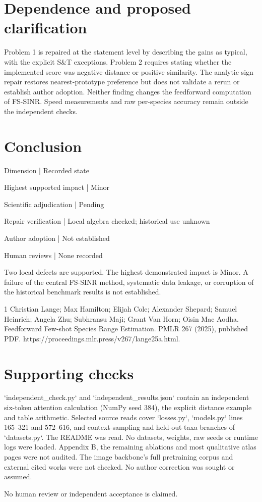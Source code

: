 \documentclass[10pt]{article}
\begin{document}
\section*{Dependence and proposed clarification}
Problem 1 is repaired at the statement level by describing the gains as typical, with the explicit S\&T exceptions. Problem 2 requires stating whether the implemented score was negative distance or positive similarity. The analytic sign repair restores nearest-prototype preference but does not validate a rerun or establish author adoption. Neither finding changes the feedforward computation of FS-SINR. Speed measurements and raw per-species accuracy remain outside the independent checks.\par
\section*{Conclusion}
Dimension | Recorded state\par
Highest supported impact | Minor\par
Scientific adjudication | Pending\par
Repair verification | Local algebra checked; historical use unknown\par
Author adoption | Not established\par
Human reviews | None recorded\par
Two local defects are supported. The highest demonstrated impact is Minor. A failure of the central FS-SINR method, systematic data leakage, or corruption of the historical benchmark results is not established.\par
1 Christian Lange; Max Hamilton; Elijah Cole; Alexander Shepard; Samuel Heinrich; Angela Zhu; Subhransu Maji; Grant Van Horn; Oisin Mac Aodha. Feedforward Few-shot Species Range Estimation. PMLR 267 (2025), published PDF. https://proceedings.mlr.press/v267/lange25a.html.\par
\section*{Supporting checks}
`independent\_check.py` and `independent\_results.json` contain an independent six-token attention calculation (NumPy seed 384), the explicit distance example and table arithmetic. Selected source reads cover `losses.py`, `models.py` lines 165–321 and 572–616, and context-sampling and held-out-taxa branches of `datasets.py`. The README was read. No datasets, weights, raw seeds or runtime logs were loaded. Appendix B, the remaining ablations and most qualitative atlas pages were not audited. The image backbone’s full pretraining corpus and external cited works were not checked. No author correction was sought or assumed.\par
No human review or independent acceptance is claimed.\par
\end{document}
